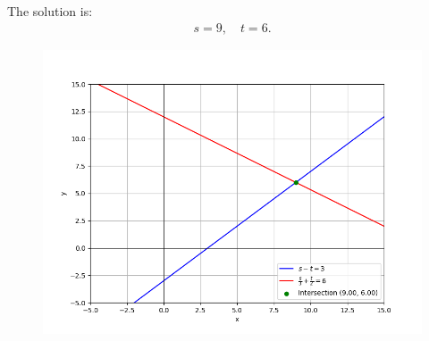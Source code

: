 \documentclass[journal]{IEEEtran}
\begin{document}
The solution is:
\begin{align}
    s = 9, \quad t = 6.
\end{align}

 \begin{figure}[h!]
	\centering
	\includegraphics[width=\columnwidth]{figures/Figure_1.png}
	\label{stemplot}
\end{figure}
\end{document}

